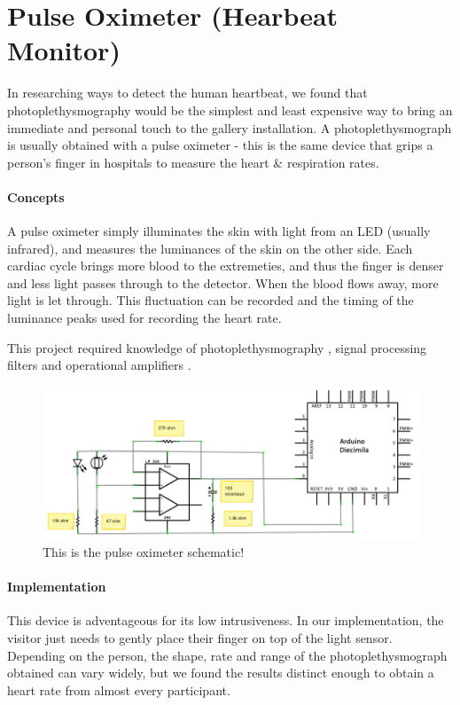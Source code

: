\section{Pulse Oximeter (Hearbeat Monitor)}
In researching ways to detect the human heartbeat, we found that photoplethysmography would be the simplest and least expensive way to bring an immediate and personal touch to the gallery installation. A photoplethysmograph is usually obtained with a pulse oximeter - this is the same device that grips a person's finger in hospitals to measure the heart \& respiration rates. 

\paragraph{Concepts}
A pulse oximeter simply illuminates the skin with light from an LED (usually infrared), and measures the luminances of the skin on the other side. Each cardiac cycle brings more blood to the extremeties, and thus the finger is denser and less light passes through to the detector. When the blood flows away, more light is let through. This fluctuation can be recorded and the timing of the luminance peaks used for recording the heart rate.

This project required knowledge of photoplethysmography \cite{PO} \cite{EC1}, signal processing filters \cite{EC2} and operational amplifiers \cite{HL} \cite{BK} \cite{BB}.

\begin{figure}[htp]\centering
  \includegraphics[width=.99\textwidth]{images/schematic-final.png}
  \caption{This is the pulse oximeter schematic!}\label{fig:poschem}
\end{figure}
\paragraph{Implementation}
This device is adventageous for its low intrusiveness. In our implementation, the visitor just needs to gently place their finger on top of the light sensor. Depending on the person, the shape, rate and range of the photoplethysmograph obtained can vary widely, but we found the results distinct enough to obtain a heart rate from almost every participant. 

